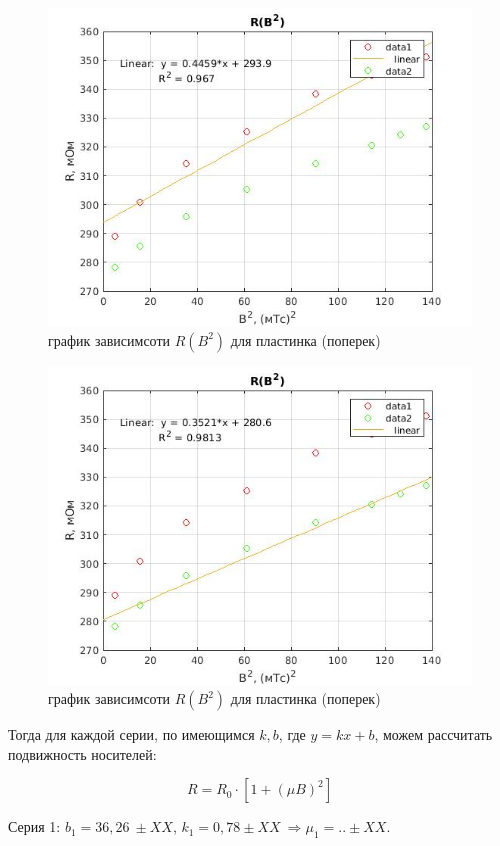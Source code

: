 \documentclass[a4paper, 12pt]{article}%
\begin{document}
\begin{center}
\begin{figure}[!h]
    \centering
    \includegraphics[width = 10 cm]{graph2(no_disk_poperek).jpg}
    \caption{график зависимсоти $R(B^2)$ для пластинка (поперек)}
    \label{ser2}
\end{figure}
\end{center}


\begin{center}
\begin{figure}[!h]
    \centering
    \includegraphics[width = 10 cm]{graph2(no_disk_vdol).jpg}
    \caption{график зависимсоти $R(B^2)$ для пластинка (поперек)}
    \label{ser3}
\end{figure}
\end{center}

Тогда для каждой серии, по имеющимся $k,b$, где $y = kx + b$, можем рассчитать подвижность носителей:

\[ R = R_0\cdot\left[1 + (\mu B)^2\right] \]

Серия 1: $b_1 = 36,26\ \pm XX$, $k_1 = 0,78 \pm XX\ \Rightarrow \mu_1 = .. \pm XX$.
\end{document}
